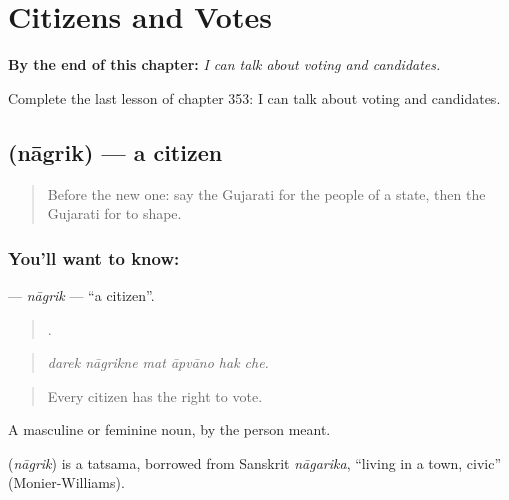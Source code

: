 
\chapter{Citizens and Votes}
\label{ch:gu-citizens-and-votes}

\begin{chapteropening}
\textbf{By the end of this chapter:} \emph{I can talk about voting and candidates.}

Complete the last lesson of chapter 353: I can talk about voting and candidates.
\end{chapteropening}

\section[\texorpdfstring{\gu{નાગરિક} (nāgrik)}{નાગરિક (nāgrik)}]{ (nāgrik) — a citizen}

\label{lesson:GU-C353-nagrik}



\begin{quote}
Before the new one: say the Gujarati for the people of a state, then the Gujarati for to shape.
\end{quote}

\subsection*{You'll want to know: }
\textbf{} — \emph{nāgrik} — \textquotedblleft{}a citizen\textquotedblright{}.

\begin{quote}
     .
\end{quote}

\begin{quote}
\emph{darek nāgrikne mat āpvāno hak che.}
\end{quote}

\begin{quote}
Every citizen has the right to vote.
\end{quote}

A masculine or feminine noun, by the person meant.

\begin{cousinweb}
\textbf{} (\emph{nāgrik}) is a tatsama, borrowed from Sanskrit \emph{nāgarika}, \textquotedblleft{}living in a town, civic\textquotedblright{} (Monier-Williams).
\end{cousinweb}

